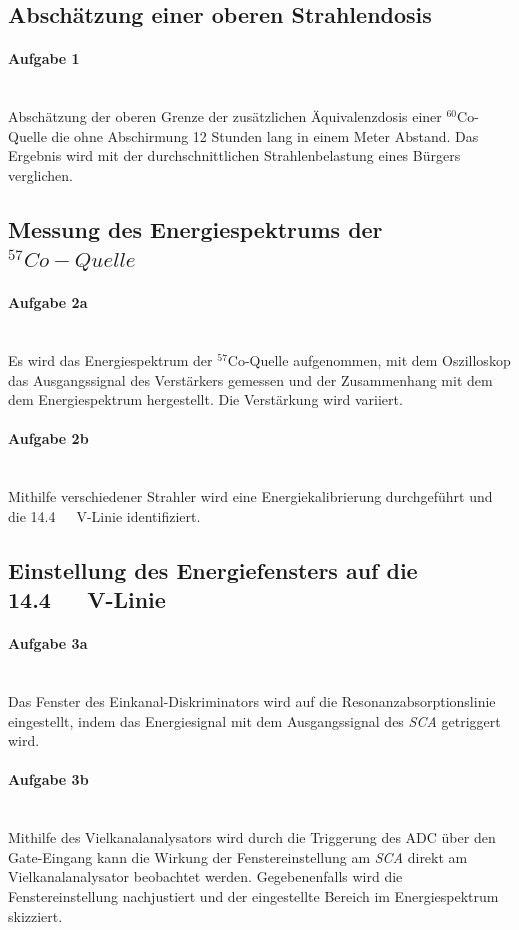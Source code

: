 \documentclass[a4paper,twoside,final]{article}
\begin{document}
\subsection{Abschätzung einer oberen Strahlendosis}
\paragraph{Aufgabe 1}$~$\\
Abschätzung der oberen Grenze der zusätzlichen Äquivalenzdosis einer $^{60}$Co-Quelle die ohne Abschirmung 12 Stunden lang in einem Meter Abstand. Das Ergebnis wird mit der durchschnittlichen Strahlenbelastung eines Bürgers verglichen.
\subsection{Messung des Energiespektrums der $^{57}Co-Quelle$}

\paragraph{Aufgabe 2a}$~$\\
Es wird das Energiespektrum der $^{57}$Co-Quelle aufgenommen, mit dem Oszilloskop das Ausgangssignal des Verstärkers gemessen und der Zusammenhang mit dem dem Energiespektrum hergestellt. Die Verstärkung wird variiert.
\paragraph{Aufgabe 2b}$~$\\
Mithilfe verschiedener Strahler wird eine Energiekalibrierung durchgeführt und die \SI{14,4}{\kilo{}\volt}-Linie identifiziert.

\subsection{Einstellung des Energiefensters auf die \SI{14,4}{\kilo{}\volt}-Linie}
\paragraph{Aufgabe 3a}$~$\\
Das Fenster des Einkanal-Diskriminators wird auf die Resonanzabsorptionslinie eingestellt, indem das Energiesignal mit dem Ausgangssignal des \textit{SCA} getriggert wird.
\paragraph{Aufgabe 3b}$~$\\
Mithilfe des Vielkanalanalysators wird durch die Triggerung des ADC über den Gate-Eingang kann die Wirkung der Fenstereinstellung am \textit{SCA} direkt am Vielkanalanalysator beobachtet werden. Gegebenenfalls wird die Fenstereinstellung nachjustiert und der eingestellte Bereich im Energiespektrum skizziert.
\end{document}
